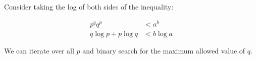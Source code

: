 \documentclass{article}
\begin{document}
Consider taking the log of both sides of the inequality:

\begin{align*}
p^qq^p &< a^b\\
q\log p + p\log q &< b\log a
\end{align*}

We can iterate over all $p$ and binary search for the maximum allowed value of $q$. 
\end{document}
